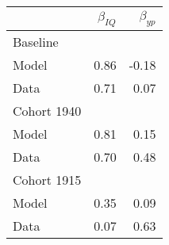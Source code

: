 \begin{tabular}{lrr}
\hline
  & $\beta_{IQ}$  & $\beta_{yp}$  \\
\hline
Baseline &   &   \\
Model & 0.86  & -0.18  \\
Data & 0.71  & 0.07  \\
Cohort 1940 &   &   \\
Model & 0.81  & 0.15  \\
Data & 0.70  & 0.48  \\
Cohort 1915 &   &   \\
Model & 0.35  & 0.09  \\
Data & 0.07  & 0.63  \\
\hline
\end{tabular}%
